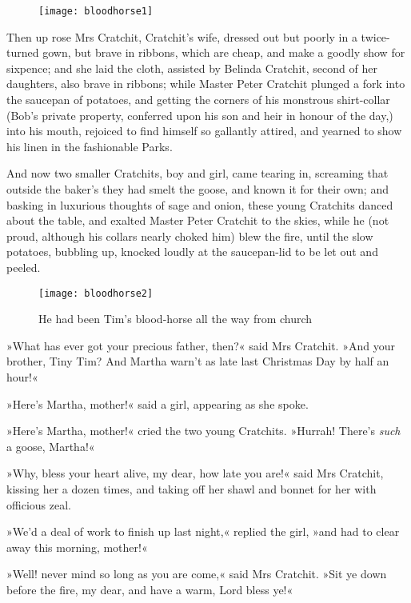 \begin{figure}[t!]
\centering
\texttt{[image: bloodhorse1]}
\end{figure}

Then up rose Mrs Cratchit, Cratchit's wife, dressed out but poorly in a twice-turned gown, but brave in ribbons, which are cheap, and make a goodly show for sixpence; and she laid the cloth, assisted by Belinda Cratchit, second of her daughters, also brave in ribbons; while Master Peter Cratchit plunged a fork into the saucepan of potatoes, and getting the corners of his monstrous shirt-collar (Bob's private property, conferred upon his son and heir in honour of the day,) into his mouth, rejoiced to find himself so gallantly attired, and yearned to show his linen in the fashionable Parks. 

And now two smaller Cratchits, boy and girl, came tearing in, screaming that outside the baker's they had smelt the goose, and known it for their own; and basking in luxurious thoughts of sage and onion, these young Cratchits danced about the table, and exalted Master Peter Cratchit to the skies, while he (not proud, although his collars nearly choked him) blew the fire, until the slow potatoes, bubbling up, knocked loudly at the saucepan-lid to be let out and peeled.


\begin{figure}[th!]
\centering
\texttt{[image: bloodhorse2]}
\caption{He had been Tim's blood-horse all the way from church}
\end{figure}


»What has ever got your precious father, then?« said Mrs Cratchit. »And your brother, Tiny Tim? And Martha warn't as late last Christmas Day by half an hour!«

»Here's Martha, mother!« said a girl, appearing as she spoke.

»Here's Martha, mother!« cried the two young Cratchits. »Hurrah! There's \textit{such} a goose, Martha!«

»Why, bless your heart alive, my dear, how late you are!« said Mrs Cratchit, kissing her a dozen times, and taking off her shawl and bonnet for her with officious zeal.

»We'd a deal of work to finish up last night,« replied the girl, »and had to clear away this morning, mother!«


»Well! never mind so long as you are come,« said Mrs Cratchit. »Sit ye down before the fire, my dear, and have a warm, Lord bless ye!«

